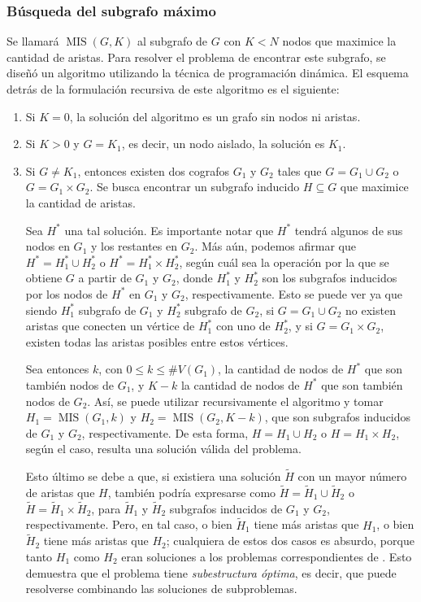 \subsubsection{Búsqueda del subgrafo máximo}
Se llamará $\operatorname{MIS}(G, K)$ al subgrafo de $G$ con $K < N$ nodos que
maximice la cantidad de aristas. Para resolver el problema de encontrar este
subgrafo, se diseñó un algoritmo utilizando la técnica de programación
dinámica. El esquema detrás de la formulación recursiva de este algoritmo es
el siguiente:

\begin{enumerate}
    \item Si $K = 0$, la solución del algoritmo es un grafo sin nodos ni
    aristas.
    \item Si $K > 0$ y $G = K_1$, es decir, un nodo aislado, la solución es
    $K_1$.
    \item Si $G \neq K_1$, entonces existen dos cografos $G_1$ y $G_2$ tales
    que $G = G_1 \cup G_2$ o $G = G_1 \times G_2$. Se busca encontrar un
    subgrafo inducido $H \subseteq G$ que maximice la cantidad de aristas.

    Sea $H^*$ una tal solución. Es importante notar que $H^*$ tendrá algunos
    de sus nodos en $G_1$ y los restantes en $G_2$. Más aún, podemos afirmar
    que $H^* = H^*_1 \cup H^*_2$ o $H^* = H^*_1 \times H^*_2$, según cuál sea
    la operación por la que se obtiene $G$ a partir de $G_1$ y $G_2$, donde
    $H^*_1$ y $H^*_2$ son los subgrafos inducidos por los nodos de $H^*$ en
    $G_1$ y $G_2$, respectivamente. Esto se puede ver ya que siendo $H^*_1$
    subgrafo de $G_1$ y $H^*_2$ subgrafo de $G_2$, si $G = G_1 \cup G_2$ no
    existen aristas que conecten un vértice de $H^*_1$ con uno de $H^*_2$, y
    si $G = G_1 \times G_2$, existen todas las aristas posibles entre estos
    vértices.

    Sea entonces $k$, con $0 \leq k \leq \#V(G_1)$, la cantidad de nodos de
    $H^*$ que son también nodos de $G_1$, y $K - k$ la cantidad de nodos de
    $H^*$ que son también nodos de $G_2$. Así, se puede utilizar
    recursivamente el algoritmo y tomar $H_1 = \operatorname{MIS}(G_1, k)$ y
    $H_2 = \operatorname{MIS}(G_2, K - k)$, que son subgrafos inducidos de
    $G_1$ y $G_2$, respectivamente. De esta forma, $H = H_1 \cup H_2$ o $H =
    H_1 \times H_2$, según el caso, resulta una solución válida del problema.

    Esto último se debe a que, si existiera una solución $\tilde{H}$ con un
    mayor número de aristas que $H$, también podría expresarse como $\tilde{H}
    = \tilde{H}_1 \cup \tilde{H}_2$ o $\tilde{H} = \tilde{H}_1 \times \tilde
    {H}_2$, para $\tilde{H}_1$ y $\tilde{H}_2$ subgrafos inducidos de $G_1$ y
    $G_2$, respectivamente. Pero, en tal caso, o bien $\tilde{H}_1$ tiene más
    aristas que $H_1$, o bien $\tilde{H}_2$ tiene más aristas que $H_2$;
    cualquiera de estos dos casos es absurdo, porque tanto $H_1$ como $H_2$
    eran soluciones a los problemas correspondientes de . Esto
    demuestra que el problema tiene \emph{subestructura óptima}, es decir, que
    puede resolverse combinando las soluciones de subproblemas.


\end{enumerate}

